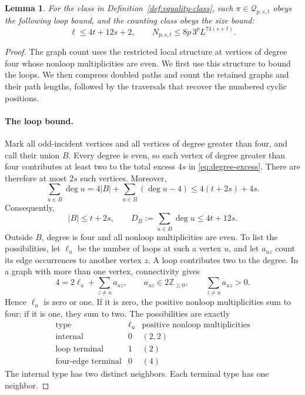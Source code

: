 \documentclass[11pt]{article}
\newtheorem{lemma}[theorem]{Lemma}
\theoremstyle{definition}
\theoremstyle{remark}
\theoremstyle{plain}
\begin{document}
\begin{lemma}\label{lem:count}
For the class in Definition~\ref{def:equality-class}, each
$\pi\in\mathcal Q_{p,s,t}$ obeys the
following loop bound, and the counting class obeys the size bound:
\begin{equation}\label{eq:equality-count}
 \ell\le4t+12s+2,\qquad
                N_{p,s,t}\le8p\,3^p L^{74(s+t)}.
\end{equation}
\end{lemma}
\begin{proof}
The graph count uses the restricted local structure at vertices
of degree four whose nonloop multiplicities are even. We first use
this structure to bound the loops. We then compress doubled paths
and count the retained graphs and their path lengths, followed by
the traversals that recover the numbered cyclic positions.

\paragraph{The loop bound.}
Mark all odd-incident vertices and all vertices of degree greater
than four, and call their union \(B\). Every degree is even, so
each vertex of degree greater than four contributes at least two
to the total excess $4s$ in \eqref{eq:degree-excess}. There are
therefore at most \(2s\) such vertices. Moreover,
\[
 \sum_{u\in B}\deg u
 =4|B|+\sum_{u\in B}(\deg u-4)
 \le4(t+2s)+4s.
\]
Consequently,
\begin{equation}\label{eq:marked-degree}
 |B|\le t+2s,\qquad D_B:=\sum_{u\in B}\deg u\le4t+12s.
\end{equation}
Outside \(B\), degree is four and all nonloop multiplicities are
even. To list the possibilities, let $\ell_u$ be the number of loops
at such a vertex $u$, and let $a_{uz}$ count its edge occurrences
to another vertex $z$. A loop contributes two to the degree. In a
graph with more than one vertex, connectivity gives
\[
 4=2\ell_u+\sum_{z\ne u}a_{uz},\qquad
 a_{uz}\in2\mathbb Z_{\ge0},\qquad
 \sum_{z\ne u}a_{uz}>0.
\]
Hence $\ell_u$ is zero or one. If it is zero, the positive
nonloop multiplicities sum to four; if it is one, they sum to two.
The possibilities are exactly
\[
\begin{array}{c|c|c}
 \text{type} & \ell_u & \text{positive nonloop multiplicities}\\ \hline
 \text{internal} &0&(2,2)\\
 \text{loop terminal} &1&(2)\\
 \text{four-edge terminal} &0&(4)
\end{array}
\]
The internal type has two distinct neighbors. Each terminal type
has one neighbor.


\end{proof}
\end{document}

